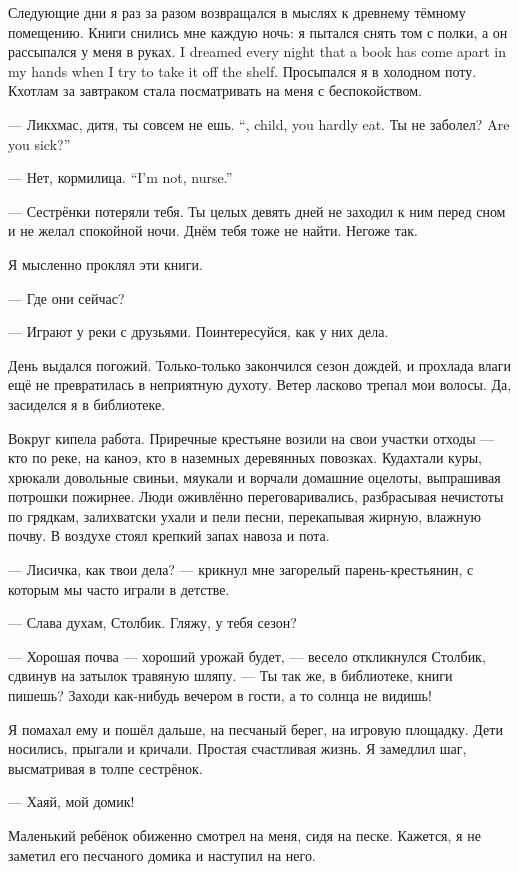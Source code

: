 Следующие дни я раз за разом возвращался в мыслях к древнему тёмному помещению.
{Книги снились мне каждую ночь: я пытался снять том с полки, а он рассыпался у меня в руках.}
{I dreamed every night that a book has come apart in my hands when I try to take it off the shelf.}
Просыпался я в холодном поту.
Кхотлам за завтраком стала посматривать на меня с беспокойством.

{--- Ликхмас, дитя, ты совсем не ешь.}
{``\Likchmas, child, you hardly eat.}
{Ты не заболел?}
{Are you sick?''}

{--- Нет, кормилица.}
{``I'm not, nurse.''}

--- Сестрёнки потеряли тебя.
Ты целых девять дней не заходил к ним перед сном и не желал спокойной ночи.
Днём тебя тоже не найти.
Негоже так.

Я мысленно проклял эти книги.

--- Где они сейчас?

--- Играют у реки с друзьями.
Поинтересуйся, как у них дела.

День выдался погожий.
Только-только закончился сезон дождей, и прохлада влаги ещё не превратилась в неприятную духоту.
Ветер ласково трепал мои волосы.
Да, засиделся я в библиотеке.

Вокруг кипела работа.
Приречные крестьяне возили на свои участки отходы --- кто по реке, на каноэ, кто в наземных деревянных повозках.
Кудахтали куры, хрюкали довольные свиньи, мяукали и ворчали домашние оцелоты, выпрашивая потрошки пожирнее.
Люди оживлённо переговаривались, разбрасывая нечистоты по грядкам, залихватски ухали и пели песни, перекапывая жирную, влажную почву.
В воздухе стоял крепкий запах навоза и пота.

--- Лисичка, как твои дела? --- крикнул мне загорелый парень-крестьянин, с которым мы часто играли в детстве.

--- Слава духам, Столбик.
Гляжу, у тебя сезон?

--- Хорошая почва --- хороший урожай будет, --- весело откликнулся Столбик, сдвинув на затылок травяную шляпу.
--- Ты так же, в библиотеке, книги пишешь?
Заходи как-нибудь вечером в гости, а то солнца не видишь!

Я помахал ему и пошёл дальше, на песчаный берег, на игровую площадку.
Дети носились, прыгали и кричали.
Простая счастливая жизнь.
Я замедлил шаг, высматривая в толпе сестрёнок.

--- Хаяй, мой домик!

Маленький ребёнок обиженно смотрел на меня, сидя на песке.
Кажется, я не заметил его песчаного домика и наступил на него.

